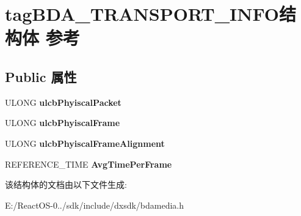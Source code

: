 \hypertarget{structtag_b_d_a___t_r_a_n_s_p_o_r_t___i_n_f_o}{}\section{tag\+B\+D\+A\+\_\+\+T\+R\+A\+N\+S\+P\+O\+R\+T\+\_\+\+I\+N\+F\+O结构体 参考}
\label{structtag_b_d_a___t_r_a_n_s_p_o_r_t___i_n_f_o}
\subsection*{Public 属性}
\begin{DoxyCompactItemize}
\item 
\mbox{\label{structtag_b_d_a___t_r_a_n_s_p_o_r_t___i_n_f_o_a2f63e21081057d97bf6302cef05d83e8}} 
U\+L\+O\+NG {\bfseries ulcb\+Phyiscal\+Packet}
\item 
\mbox{\label{structtag_b_d_a___t_r_a_n_s_p_o_r_t___i_n_f_o_a5db8657672b3b1d3f93cd9008b22020b}} 
U\+L\+O\+NG {\bfseries ulcb\+Phyiscal\+Frame}
\item 
\mbox{\label{structtag_b_d_a___t_r_a_n_s_p_o_r_t___i_n_f_o_ab288deb345e63ff4b6ca8897eed7572d}} 
U\+L\+O\+NG {\bfseries ulcb\+Phyiscal\+Frame\+Alignment}
\item 
\mbox{\label{structtag_b_d_a___t_r_a_n_s_p_o_r_t___i_n_f_o_a9752700346f352485b0e9cc7c74ad0f4}} 
R\+E\+F\+E\+R\+E\+N\+C\+E\+\_\+\+T\+I\+ME {\bfseries Avg\+Time\+Per\+Frame}
\end{DoxyCompactItemize}


该结构体的文档由以下文件生成\+:\begin{DoxyCompactItemize}
\item 
E\+:/\+React\+O\+S-\/0../sdk/include/dxsdk/bdamedia.\+h\end{DoxyCompactItemize}
